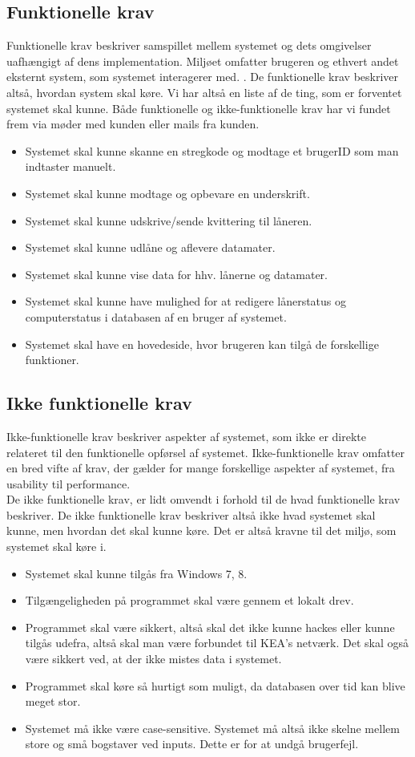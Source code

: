 \documentclass[a4paper]{article}
\begin{document}
\subsection{Funktionelle krav}
Funktionelle krav beskriver samspillet mellem systemet og dets omgivelser uafhængigt af dens implementation. Miljøet omfatter brugeren og ethvert andet eksternt system, som systemet interagerer med. \cite[p~125]{OOSE}. De funktionelle krav beskriver altså, hvordan system skal køre. Vi har altså en liste af de ting, som er forventet systemet skal kunne. Både funktionelle og ikke-funktionelle krav har vi fundet frem via møder med kunden eller mails fra kunden.
\begin{itemize}
	\item Systemet skal kunne skanne en stregkode og modtage et brugerID som man indtaster manuelt.
	\item Systemet skal kunne modtage og opbevare en underskrift.
	\item Systemet skal kunne udskrive/sende kvittering til låneren.
	\item Systemet skal kunne udlåne og aflevere datamater.
	\item Systemet skal kunne vise data for hhv. lånerne og datamater.
	\item Systemet skal kunne have mulighed for at redigere lånerstatus og computerstatus i databasen af en bruger af systemet.
	\item Systemet skal have en hovedeside, hvor brugeren kan tilgå de forskellige funktioner.
\end{itemize}
\subsection{Ikke funktionelle krav}
Ikke-funktionelle krav beskriver aspekter af systemet, som ikke er direkte relateret til den funktionelle opførsel af systemet. Ikke-funktionelle krav omfatter en bred vifte af krav, der gælder for mange forskellige aspekter af systemet, fra usability til performance. \cite[p119]{OOSE} \\ De ikke funktionelle krav, er lidt omvendt i forhold til de hvad funktionelle krav beskriver. De ikke funktionelle krav beskriver altså ikke hvad systemet skal kunne, men hvordan det skal kunne køre. Det er altså kravne til det miljø, som systemet skal køre i.
\begin{itemize}
	\item Systemet skal kunne tilgås fra Windows 7, 8.
	\item Tilgængeligheden på programmet skal være gennem et lokalt drev.
	\item Programmet skal være sikkert, altså skal det ikke kunne hackes eller kunne tilgås udefra, altså skal man være forbundet til KEA's netværk. Det skal også være sikkert ved, at der ikke mistes data i systemet.
	\item Programmet skal køre så hurtigt som muligt, da databasen over tid kan blive meget stor.
	\item Systemet må ikke være case-sensitive. Systemet må altså ikke skelne mellem store og små bogstaver ved inputs. Dette er for at undgå brugerfejl.
\end{itemize}
\newpage
\end{document}
